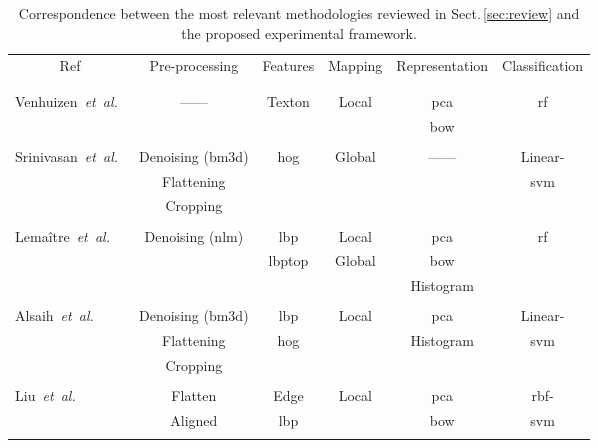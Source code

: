 \begin{table*}
  \caption{Correspondence between the most relevant methodologies reviewed in Sect.\,\ref{sec:review} and the proposed experimental framework.}
\centering
\footnotesize{
\begin{tabular}{l c	c c c c }
\toprule
\multicolumn{1}{c}{Ref} & Pre-processing & Features &  Mapping &  Representation & Classification\\
    &  &  &  &  & \\
\midrule
	&  &  &  &  & \\
\multirow{2}{*}{Venhuizen~\textit{et~al.}~\cite{Venhuizen2015,venhuizen2015feb-repoICPR}} & \multirow{2}{*}{------}  & \multirow{2}{*}{Texton} & \multirow{2}{*}{Local}   &\gls{pca} & \multirow{2}{*}{\gls{rf}} \\
	&  &  &  & \gls{bow} & \\
	&  &  &  &  & \\
\multirow{3}{*}{Srinivasan~\textit{et~al.}~\cite{Srinivasan2014, srinivasan2014oct-repoICPR}} & Denoising (\gls{bm3d}) & \multirow{3}{*}{\gls{hog}} & \multirow{3}{*}{Global} & \multirow{3}{*}{------} &  Linear- \\
 & Flattening & & & &\gls{svm} \\
 & Cropping & & & & \\
	&  &  &  &  & \\
\multirow{3}{*}{Lema\^itre~\textit{et~al.}~\cite{Lemaintre2015miccaiOCT, lemaitre2015apr-repoICPR}} & \multirow{3}{*}{ Denoising (\gls{nlm}) } & \gls{lbp} & Local &  \gls{pca} &  \multirow{3}{*}{\gls{rf}} \\
& & \gls{lbptop} & Global & \gls{bow}& \\
	&  &  &  &Histogram & \\
&  &  &  &  & \\

\multirow{3}{*}{Alsaih~\textit{et~al.}~\cite{alsaih2016classification, Alsaih2016apr-repoICPR}} & Denoising (\gls{bm3d}) & \gls{lbp} & \multirow{3}{*}{Local} &  \gls{pca} &  Linear- \\
& Flattening & \gls{hog} &  & Histogram  & \gls{svm}\\
& Cropping & & & & \\
&  &  &  &  & \\

\multirow{2}{*}{Liu~\textit{et~al.}~\cite{Liu2011,liu20016apr-repoICPR}} & Flatten & Edge & \multirow{2}{*}{Local} & \gls{pca}& \gls{rbf}- \\
 & Aligned & \gls{lbp} & &\gls{bow} & \gls{svm} \\
 	&  &  &  &  & \\


\end{tabular}}
\end{table*}
